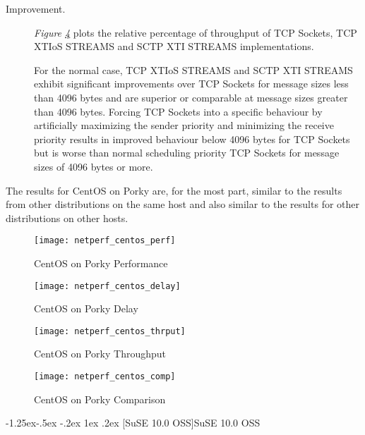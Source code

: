 \documentclass[letterpaper,final,notitlepage,twocolumn,10pt,twoside]{article}
\makeatletter
\let\normalsize = \small
\let\small = \footnotesize
\let\footnotesize = \scriptsize
\let\scriptsize = \tiny
\renewcommand\subsubsection{\@startsection{subsubsection}{3}{\z@}%
                                     {-1.25ex\@plus -.5ex \@minus -.2ex}%
                                     {1ex \@plus .2ex}%
                                     {\normalfont\normalsize\bfseries}}
\makeatother
\begin{document}
\begin{description}
\item[Improvement.]

\textit{Figure \ref{figure:centoscomp}}
plots the relative percentage of throughput of TCP Sockets, TCP XTIoS STREAMS and SCTP XTI STREAMS
implementations.

For the normal case, TCP XTIoS STREAMS and SCTP XTI STREAMS exhibit significant improvements over
TCP Sockets for message sizes less than 4096 bytes and are superior or comparable  at message sizes
greater than 4096 bytes.  Forcing TCP Sockets into a specific behaviour by artificially maximizing
the sender priority and minimizing the receive priority results in improved behaviour below 4096
bytes for TCP Sockets but is worse than normal scheduling priority TCP Sockets for message sizes of
4096 bytes or more.

\end{description}

The results for CentOS on Porky are, for the most part, similar to the results from other
distributions on the same host and also similar to the results for other distributions on other
hosts.

\begin{figure}[p]
\center\texttt{[image: netperf\_centos\_perf]}
\caption[CentOS on Porky Performance]{CentOS on Porky Performance}
\label{figure:centosperf}
\end{figure}

\begin{figure}[p]
\center\texttt{[image: netperf\_centos\_delay]}
\caption[CentOS on Porky Delay]{CentOS on Porky Delay}
\label{figure:centosdly}
\end{figure}

\begin{figure}[p]
\center\texttt{[image: netperf\_centos\_thrput]}
\caption[CentOS on Porky Throughput]{CentOS on Porky Throughput}
\label{figure:centosthrput}
\end{figure}

\begin{figure}[pt]
\center\texttt{[image: netperf\_centos\_comp]}
\caption[CentOS on Porky Comparison]{CentOS on Porky Comparison}
\label{figure:centoscomp}
\end{figure}

\subsubsection[SuSE 10.0 OSS]{SuSE 10.0 OSS}
\end{document}
